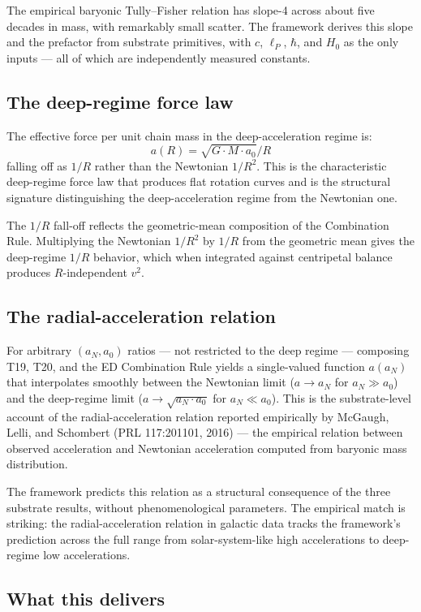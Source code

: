 \documentclass[11pt,a4paper]{article}
\begin{document}
The empirical baryonic Tully--Fisher relation has slope-4 across about five decades in mass, with remarkably small scatter. The framework derives this slope and the prefactor from substrate primitives, with $c$, $\ell_P$, $\hbar$, and $H_0$ as the only inputs --- all of which are independently measured constants.

\subsection{The deep-regime force law}

The effective force per unit chain mass in the deep-acceleration regime is:
\[
a(R) = \sqrt{G \cdot M \cdot a_{0}} / R
\]
falling off as $1/R$ rather than the Newtonian $1/R^2$. This is the characteristic deep-regime force law that produces flat rotation curves and is the structural signature distinguishing the deep-acceleration regime from the Newtonian one.

The $1/R$ fall-off reflects the geometric-mean composition of the Combination Rule. Multiplying the Newtonian $1/R^2$ by $1/R$ from the geometric mean gives the deep-regime $1/R$ behavior, which when integrated against centripetal balance produces $R$-independent $v^2$.

\subsection{The radial-acceleration relation}

For arbitrary $(a_N, a_0)$ ratios --- not restricted to the deep regime --- composing T19, T20, and the ED Combination Rule yields a single-valued function $a(a_N)$ that interpolates smoothly between the Newtonian limit ($a \to a_N$ for $a_N \gg a_0$) and the deep-regime limit ($a \to \sqrt{a_N \cdot a_0}$ for $a_N \ll a_0$). This is the substrate-level account of the radial-acceleration relation reported empirically by McGaugh, Lelli, and Schombert (PRL 117:201101, 2016) --- the empirical relation between observed acceleration and Newtonian acceleration computed from baryonic mass distribution.

The framework predicts this relation as a structural consequence of the three substrate results, without phenomenological parameters. The empirical match is striking: the radial-acceleration relation in galactic data tracks the framework's prediction across the full range from solar-system-like high accelerations to deep-regime low accelerations.

\subsection{What this delivers}
\end{document}
